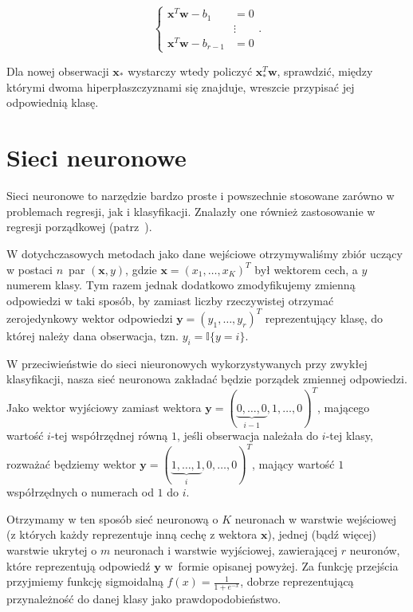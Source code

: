 \documentclass{mini}
\begin{document}
$$\begin{cases}
\textbf{x}^T\textbf{w}-b_1 &=0\\
&\vdots \\
\textbf{x}^T\textbf{w}-b_{r-1} &=0
\end{cases}.
$$

Dla nowej obserwacji $\textbf{x}_\ast$ wystarczy wtedy policzyć $\textbf{x}_\ast^T\textbf{w}$, sprawdzić, między którymi dwoma hiperpłaszczyznami się znajduje, wreszcie przypisać jej odpowiednią klasę.

\section{Sieci neuronowe}
 
Sieci neuronowe to narzędzie bardzo proste i powszechnie stosowane zarówno w problemach regresji, jak i klasyfikacji. Znalazły one również zastosowanie w regresji porządkowej (patrz~\cite{nna}). 

W dotychczasowych metodach jako dane wejściowe otrzymywaliśmy zbiór uczący w postaci $n$~par $(\textbf{x},y)$, gdzie $\textbf{x} = (x_1, \ldots, x_K)^T$ był wektorem cech, a $y$ numerem klasy. Tym razem jednak dodatkowo zmodyfikujemy zmienną odpowiedzi w taki sposób, by zamiast liczby rzeczywistej otrzymać zerojedynkowy wektor odpowiedzi $\textbf{y} = (y_1, \ldots, y_r)^T$ reprezentujący klasę, do której należy dana obserwacja, tzn. $y_i = \mathbb{I}\lbrace y =i \rbrace$.

W przeciwieństwie do sieci nieuronowych wykorzystywanych przy zwykłej klasyfikacji, nasza sieć neuronowa zakładać będzie porządek zmiennej odpowiedzi. Jako wektor wyjściowy zamiast wektora $\textbf{y} = (\underbrace{0, \ldots, 0}_{i-1}, 1, \ldots, 0)^T$, mającego wartość $i$-tej współrzędnej równą $1$, jeśli obserwacja należała do $i$-tej klasy, rozważać będziemy wektor $\textbf{y} = (\underbrace{1, \ldots, 1}_{i}, 0, \ldots, 0)^T$, mający wartość $1$ współrzędnych o numerach od $1$ do $i$.

Otrzymamy w ten sposób sieć neuronową o $K$ neuronach w warstwie wejściowej (z których każdy reprezentuje inną cechę z wektora $\textbf{x}$), jednej (bądź więcej) warstwie ukrytej o $m$ neuronach i warstwie wyjściowej, zawierającej $r$ neuronów, które reprezentują odpowiedź $\textbf{y}$ w~formie opisanej powyżej. Za funkcję przejścia przyjmiemy funkcję sigmoidalną $f(x) = \frac{1}{1+e^{-x}}$, dobrze reprezentującą przynależność do danej klasy jako prawdopodobieństwo. 
\end{document}
